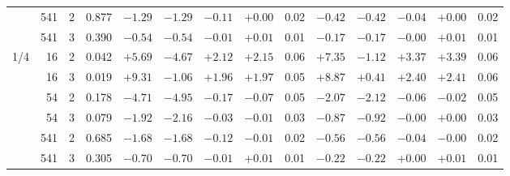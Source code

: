 \documentclass[11pt,aps,preprint,nofootinbib,superscriptaddress,tightenlines]{revtex4-2}
\begin{document}
\begin{table}[h]
\begin{center}
\begin{tabular}{lrrr|rrrrr|rrrrr}
 & 541 & 2 & 0.877 & $-1.29$ & $-1.29$ & $-0.11$ & $+0.00$ & 0.02 & $-0.42$ & $-0.42$ & $-0.04$ & $+0.00$ & 0.02 \\
 & 541 & 3 & 0.390 & $-0.54$ & $-0.54$ & $-0.01$ & $+0.01$ & 0.01 & $-0.17$ & $-0.17$ & $-0.00$ & $+0.01$ & 0.01 \\
\midrule
1/4 & 16 & 2 & 0.042 & $+5.69$ & $-4.67$ & $+2.12$ & $+2.15$ & 0.06 & $+7.35$ & $-1.12$ & $+3.37$ & $+3.39$ & 0.06 \\
 & 16 & 3 & 0.019 & $+9.31$ & $-1.06$ & $+1.96$ & $+1.97$ & 0.05 & $+8.87$ & $+0.41$ & $+2.40$ & $+2.41$ & 0.06 \\
 & 54 & 2 & 0.178 & $-4.71$ & $-4.95$ & $-0.17$ & $-0.07$ & 0.05 & $-2.07$ & $-2.12$ & $-0.06$ & $-0.02$ & 0.05 \\
 & 54 & 3 & 0.079 & $-1.92$ & $-2.16$ & $-0.03$ & $-0.01$ & 0.03 & $-0.87$ & $-0.92$ & $-0.00$ & $+0.00$ & 0.03 \\
 & 541 & 2 & 0.685 & $-1.68$ & $-1.68$ & $-0.12$ & $-0.01$ & 0.02 & $-0.56$ & $-0.56$ & $-0.04$ & $-0.00$ & 0.02 \\
 & 541 & 3 & 0.305 & $-0.70$ & $-0.70$ & $-0.01$ & $+0.01$ & 0.01 & $-0.22$ & $-0.22$ & $+0.00$ & $+0.01$ & 0.01 \\
\bottomrule
\end{tabular}
\end{center}
\end{table}
\end{document}
